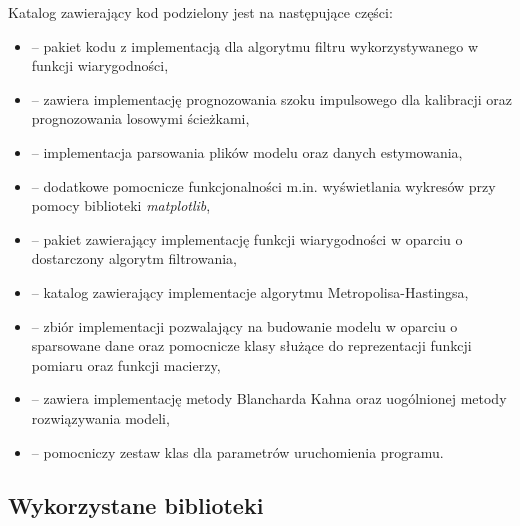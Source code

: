 Katalog zawierający kod podzielony jest na następujące części:
\begin{itemize}
    \item {} -- pakiet kodu z implementacją dla algorytmu filtru wykorzystywanego w funkcji wiarygodności,
    \item {} -- zawiera implementację prognozowania szoku impulsowego dla kalibracji oraz prognozowania losowymi ścieżkami,
    \item {} -- implementacja parsowania plików modelu oraz danych estymowania,
    \item {} -- dodatkowe pomocnicze funkcjonalności m.in. wyświetlania wykresów przy pomocy biblioteki \emph{matplotlib},
    \item {} -- pakiet zawierający implementację funkcji wiarygodności w oparciu o dostarczony algorytm filtrowania,
    \item {} -- katalog zawierający implementacje algorytmu Metropolisa-Hastingsa,
    \item {} -- zbiór implementacji pozwalający na budowanie modelu w oparciu o sparsowane dane oraz pomocnicze klasy służące do reprezentacji funkcji pomiaru oraz funkcji macierzy,
    \item {} -- zawiera implementację metody Blancharda Kahna oraz uogólnionej metody rozwiązywania modeli,
    \item {} -- pomocniczy zestaw klas dla parametrów uruchomienia programu.
\end{itemize}


\subsection{Wykorzystane biblioteki}
\label{sec:used_libraries}

